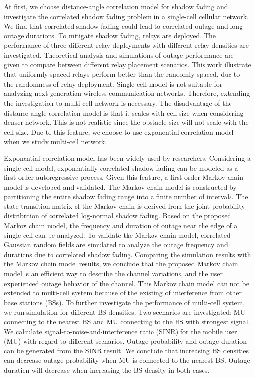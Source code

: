\par At first, we choose distance-angle correlation model for shadow fading and investigate the correlated shadow fading problem in a single-cell cellular network. We find that correlated shadow fading could lead to correlated outage and long outage durations. To mitigate shadow fading, relays are deployed. The performance of three different relay deployments with different relay densities are investigated. Theoretical analysis and simulations of outage performance are given to compare between different relay placement scenarios. This work illustrate that uniformly spaced relays perform better than the randomly spaced, due to the randomness of relay deployment. Single-cell model is not suitable for analyzing next generation wireless communication networks. Therefore, extending the investigation to multi-cell network is necessary. The disadvantage of the distance-angle correlation model is that it scales with cell size when considering denser network. This is not realistic since the obstacle size will not scale with the cell size. Due to this feature, we choose to use exponential correlation model when we study multi-cell network. 
\par Exponential correlation model has been widely used by researchers. Considering a single-cell model, exponentially correlated shadow fading can be modeled as a first-order autoregressive process. Given this feature, a first-order Markov chain model is developed and validated. The Markov chain model is constructed by partitioning the entire shadow fading range into a finite number of intervals. The state transition matrix of the Markov chain is derived from the joint probability distribution of correlated log-normal shadow fading. Based on the proposed Markov chain model, the frequency and duration of outage near the edge of a single cell can be analyzed. To validate the Markov chain model, correlated Gaussian random fields are simulated to analyze the outage frequency and durations due to correlated shadow fading. Comparing the simulation results with the Markov chain model results, we conclude that the proposed Markov chain model is an efficient way to describe the channel variations, and the user experienced outage behavior of the channel. This Markov chain model can not be extended to multi-cell system because of the existing of interference from other base stations (BSs). To further investigate the performance of multi-cell system, we run simulation for different BS densities. Two scenarios are investigated: MU connecting to the nearest BS and MU connecting to the BS with strongest signal. We calculate signal-to-noise-and-interference ratio (SINR) for the mobile user (MU) with regard to different scenarios. Outage probability and outage duration can be generated from the SINR result. We conclude that increasing BS densities can decrease outage probability when MU is connected to the nearest BS. Outage duration will decrease when increasing the BS density in both cases. 
